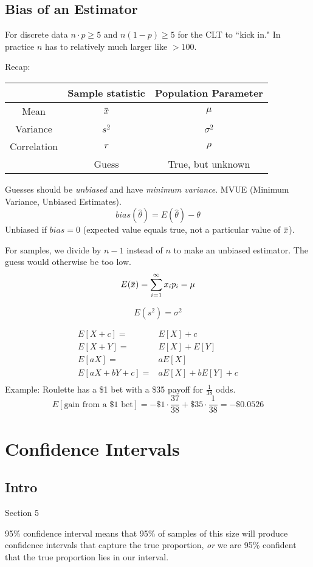 \documentclass[11pt, oneside]{article}   	%
\newcommand{\overbar}[1]{\mkern 1.5mu\overline{\mkern-1.5mu#1\mkern-1.5mu}\mkern 1.5mu}
\begin{document}
\subsection{Bias of an Estimator}

For discrete data $n\cdot p \geq 5$ and $n(1-p) \geq 5$ for the CLT to ``kick in." In practice $n$ has to relatively much larger like $> 100$.

Recap:
\begin{tabular}{| c | c | c| }
\hline
 & Sample statistic &  Population Parameter \\
 \hline
 Mean & $\overbar{x}$ & $\mu$ \\
 Variance & $s^2$ & $\sigma^2$ \\
 Correlation & $r$ & $\rho$ \\
\hline
& Guess & True, but unknown \\
\hline
\end{tabular}

Guesses should be \textit{unbiased} and have \textit{minimum variance}. MVUE (Minimum Variance, Unbiased Estimates).
\[
bias(\hat{\theta}) = E(\hat{\theta}) - \theta
\]
Unbiased if $bias = 0$ (expected value equals true, not a particular value of $\overbar{x}$). 

For samples, we divide by $n-1$ instead of $n$ to make an unbiased estimator. The guess would otherwise be too low.
\[
E(\overbar{x}) = \sum\limits_{i=1}^{\infty} x_i p_i = \mu
\]

\[
E(s^2) = \sigma^2
\]

\begin{align*}
E[X + c] =& E[X] + c\\
E[X + Y] =& E[X] + E[Y]\\
E[aX] =& a E[X]\\
E[aX + bY + c] =& aE[X] + bE[Y] +c\\
\end{align*}
Example: Roulette has a \$1 bet with a \$35 payoff for $\frac{1}{38}$ odds.
\[
E[\text{gain from a \$1 bet}] = -\$1 \cdot \frac{37}{38} + \$35 \cdot \frac{1}{38} = -\$0.0526
\]

\section{Confidence Intervals}
\subsection{Intro}
Section 5

95\% confidence interval means that 95\% of samples of this size will produce confidence intervals that capture the true proportion, \textit{or} we are 95\% confident that the true proportion lies in our interval.
\end{document}
